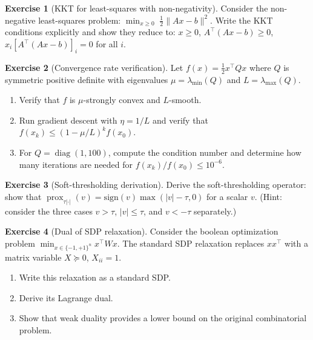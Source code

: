 \documentclass[11pt,a4paper]{article}
\theoremstyle{definition}
\newtheorem{exercise}{Exercise}[section]
\theoremstyle{plain}
\theoremstyle{remark}
\DeclareMathOperator{\prox}{prox}
\DeclareMathOperator{\diag}{diag}
\begin{document}
\begin{exercise}[KKT for least-squares with non-negativity]\label{ex:nnls}
Consider the non-negative least-squares problem:
$\min_{x \ge 0} \; \frac{1}{2}\|Ax - b\|^2$.
Write the KKT conditions explicitly and show they reduce to:
$x \ge 0$, $A^\top(Ax - b) \ge 0$, $x_i [A^\top(Ax - b)]_i = 0$ for all $i$.
\end{exercise}

\begin{exercise}[Convergence rate verification]\label{ex:gd-verify}
Let $f(x) = \frac{1}{2}x^\top Q x$ where $Q$ is symmetric positive definite
with eigenvalues $\mu = \lambda_{\min}(Q)$ and $L = \lambda_{\max}(Q)$.
\begin{enumerate}[label=(\alph*)]
  \item Verify that $f$ is $\mu$-strongly convex and $L$-smooth.
  \item Run gradient descent with $\eta = 1/L$ and verify that
    $f(x_k) \le (1 - \mu/L)^k f(x_0)$.
  \item For $Q = \diag(1, 100)$, compute the condition number and determine
    how many iterations are needed for $f(x_k)/f(x_0) \le 10^{-6}$.
\end{enumerate}
\end{exercise}

\begin{exercise}[Soft-thresholding derivation]\label{ex:soft-thresh}
Derive the soft-thresholding operator: show that
$\prox_{\tau|\cdot|}(v) = \text{sign}(v)\max(|v| - \tau, 0)$ for a scalar $v$.
(Hint: consider the three cases $v > \tau$, $|v| \le \tau$, and $v < -\tau$
separately.)
\end{exercise}

\begin{exercise}[Dual of SDP relaxation]\label{ex:sdp-dual}
Consider the boolean optimization problem $\min_{x \in \{-1,+1\}^n} x^\top W x$.
The standard SDP relaxation replaces $x x^\top$ with a matrix variable
$X \succeq 0$, $X_{ii} = 1$.
\begin{enumerate}[label=(\alph*)]
  \item Write this relaxation as a standard SDP.
  \item Derive its Lagrange dual.
  \item Show that weak duality provides a lower bound on the original
    combinatorial problem.
\end{enumerate}
\end{exercise}
\end{document}
